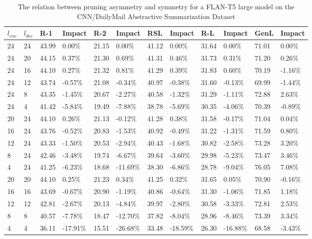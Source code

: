 \begin{table*}[!ht]
    \centering
    \caption{The relation between pruning asymmetry and symmetry for a FLAN-T5 large model on the CNN/DailyMail Abstractive Summarization Dataset}
    \small
    \begin{tabular}{|l|l|l|l|l|l|l|l|l|l|l|l|}
    \hline
        $l_{enc}$ & $l_{dec}$ & R-1 & Impact & R-2 & Impact & RSL & Impact & R-L & Impact & GenL & Impact \\ \hline
        24 & 24 & 43.99 & 0.00\% & 21.15 & 0.00\% & 41.12 & 0.00\% & 31.64 & 0.00\% & 71.01 & 0.00\% \\ \hline
        24 & 20 & 44.15 & 0.37\% & 21.30 & 0.69\% & 41.31 & 0.46\% & 31.73 & 0.31\% & 71.20 & 0.26\% \\ \hline
        24 & 16 & 44.10 & 0.27\% & 21.32 & 0.81\% & 41.29 & 0.39\% & 31.83 & 0.60\% & 70.19 & -1.16\% \\ \hline
        24 & 12 & 43.74 & -0.57\% & 21.08 & -0.34\% & 40.97 & -0.38\% & 31.60 & -0.13\% & 69.99 & -1.44\% \\ \hline
        24 & 8 & 43.35 & -1.45\% & 20.67 & -2.27\% & 40.58 & -1.32\% & 31.29 & -1.11\% & 72.88 & 2.63\% \\ \hline
        24 & 4 & 41.42 & -5.84\% & 19.49 & -7.88\% & 38.78 & -5.69\% & 30.35 & -4.06\% & 70.39 & -0.89\% \\ \hline
        20 & 24 & 44.10 & 0.26\% & 21.13 & -0.12\% & 41.28 & 0.38\% & 31.58 & -0.17\% & 71.04 & 0.04\% \\ \hline
        16 & 24 & 43.76 & -0.52\% & 20.83 & -1.53\% & 40.92 & -0.49\% & 31.22 & -1.31\% & 71.59 & 0.80\% \\ \hline
        12 & 24 & 43.33 & -1.50\% & 20.53 & -2.94\% & 40.43 & -1.68\% & 30.82 & -2.58\% & 73.28 & 3.20\% \\ \hline
        8 & 24 & 42.46 & -3.48\% & 19.74 & -6.67\% & 39.64 & -3.60\% & 29.98 & -5.23\% & 73.47 & 3.46\% \\ \hline
        4 & 24 & 41.25 & -6.23\% & 18.68 & -11.69\% & 38.30 & -6.86\% & 28.78 & -9.04\% & 76.05 & 7.08\% \\ \hline
        20 & 20 & 44.10 & 0.25\% & 21.23 & 0.34\% & 41.25 & 0.32\% & 31.65 & 0.05\% & 70.90 & -0.16\% \\ \hline
        16 & 16 & 43.69 & -0.67\% & 20.90 & -1.19\% & 40.86 & -0.64\% & 31.30 & -1.06\% & 71.85 & 1.18\% \\ \hline
        12 & 12 & 42.81 & -2.67\% & 20.13 & -4.84\% & 39.97 & -2.80\% & 30.58 & -3.33\% & 72.81 & 2.53\% \\ \hline
        8 & 8 & 40.57 & -7.78\% & 18.47 & -12.70\% & 37.82 & -8.04\% & 28.96 & -8.46\% & 73.39 & 3.34\% \\ \hline
        4 & 4 & 36.11 & -17.91\% & 15.51 & -26.68\% & 33.48 & -18.59\% & 26.30 & -16.88\% & 68.58 & -3.43\% \\ \hline
    \end{tabular}
    \label{tab:asym-large-cnndm}
\end{table*}

